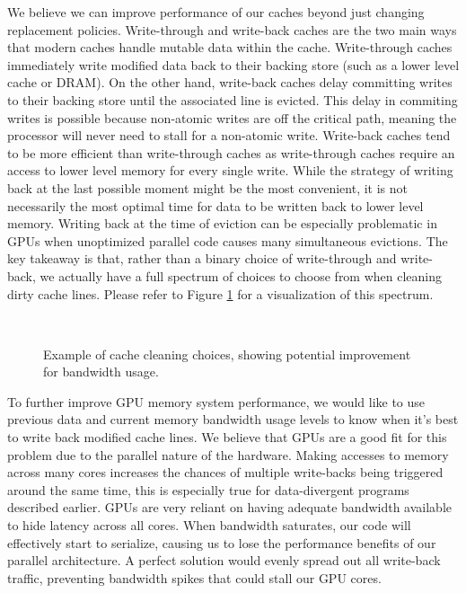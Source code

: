 We believe we can improve performance of our caches beyond just changing replacement policies. Write-through and write-back caches are the two main ways that modern caches handle mutable data within the cache. Write-through caches immediately write modified data back to their backing store (such as a lower level cache or DRAM). On the other hand, write-back caches delay committing writes to their backing store until the associated line is evicted. This delay in commiting writes is possible because non-atomic writes are off the critical path, meaning the processor will never need to stall for a non-atomic write. Write-back caches tend to be more efficient than write-through caches as write-through caches require an access to lower level memory for every single write. While the strategy of writing back at the last possible moment might be the most convenient, it is not necessarily the most optimal time for data to be written back to lower level memory. Writing back at the time of eviction can be especially problematic in GPUs when unoptimized parallel code causes many simultaneous evictions. The key takeaway is that, rather than a binary choice of write-through and write-back, we actually have a full spectrum of choices to choose from when cleaning dirty cache lines. Please refer to Figure \ref{f:bandwidth_optimal} for a visualization of this spectrum.

\begin{figure}[htb]
\begin{center}
\ 
\caption{Example of cache cleaning choices, showing potential improvement for bandwidth usage.}
\label{f:bandwidth_optimal}
\end{center}
\end{figure}
%

To further improve GPU memory system performance, we would like to use previous data and current memory bandwidth usage levels to know when it’s best to write back modified cache lines. We believe that GPUs are a good fit for this problem due to the parallel nature of the hardware. Making accesses to memory across many cores increases the chances of multiple write-backs being triggered around the same time, this is especially true for data-divergent programs described earlier. GPUs are very reliant on having adequate bandwidth available to hide latency across all cores. When bandwidth saturates, our code will effectively start to serialize, causing us to lose the performance benefits of our parallel architecture. A perfect solution would evenly spread out all write-back traffic, preventing bandwidth spikes that could stall our GPU cores.
